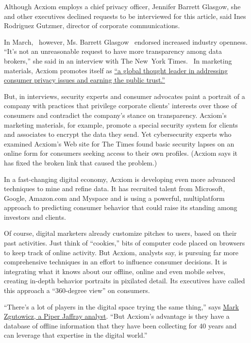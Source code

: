 Although Acxiom employs a chief privacy officer, Jennifer Barrett
Glasgow, she and other executives declined requests to be interviewed
for this article, said Ines Rodriguez Gutzmer, director of corporate
communications.

In March, ~however, Ms. Barrett Glasgow~ endorsed increased industry
openness. ``It's not an unreasonable request to have more transparency
among data brokers,'' she said in an interview with The New~York Times.~
In marketing materials, Acxiom promotes itself as
\href{https://isapps.acxiom.com/AppFiles/Download18/AcxiomPersonicX_VisionScape-723200794458.pdf}{``a
global thought leader in addressing consumer privacy issues and earning
the public trust.''}

But, in interviews, security experts and consumer advocates paint a
portrait of a company with practices that privilege corporate clients'
interests over those of consumers and contradict the company's stance on
transparency. Acxiom's marketing materials, for example, promote a
special security system for clients and associates to encrypt the data
they send. Yet cybersecurity experts who examined Acxiom's Web site for
The Times found basic security lapses on an online form for consumers
seeking access to their own profiles. (Acxiom says it has fixed the
broken link that caused the problem.)

In a fast-changing digital economy, Acxiom is developing even more
advanced techniques to mine and refine data. It has recruited talent
from Microsoft, Google, Amazon.com and Myspace and is using a powerful,
multiplatform approach to predicting consumer behavior that could raise
its standing among investors and clients.

Of course, digital marketers already customize pitches to users, based
on their past activities. Just think of ``cookies,'' bits of computer
code placed on browsers to keep track of online activity. But Acxiom,
analysts say, is pursuing far more comprehensive techniques in an effort
to influence consumer decisions. It is integrating what it knows about
our offline, online and even mobile selves, creating in-depth behavior
portraits in pixilated detail. Its executives have called this approach
a ``360-degree view'' on consumers.

``There's a lot of players in the digital space trying the same thing,''
says
\href{http://www.piperjaffray.com/1col.aspx?id=7\&analystid=455\&title=Analyst\%20Information\%20for\%20Mark\%20Zgutowicz}{Mark
Zgutowicz, a Piper Jaffray analyst}. ``But Acxiom's advantage is they
have a database of offline information that they have been collecting
for 40 years and can leverage that expertise in the digital world.''

